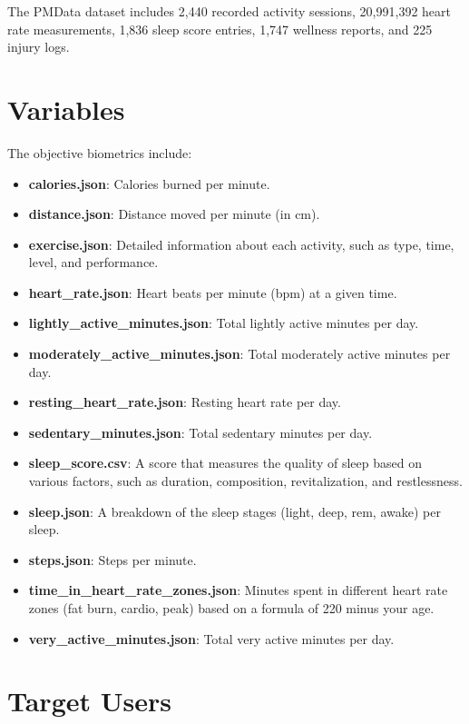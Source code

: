 \documentclass[10pt]{extarticle}
\begin{document}
The PMData dataset includes 2,440 recorded activity sessions, 20,991,392 heart rate measurements, 1,836 sleep score entries, 1,747 wellness reports, and 225 injury logs.

\newpage

\section{Variables}

The objective biometrics include:

\begin{itemize}
    \item \textbf{calories.json}: Calories burned per minute.
    \item \textbf{distance.json}: Distance moved per minute (in cm).
    \item \textbf{exercise.json}: Detailed information about each activity, such as type, time, level, and performance.
    \item \textbf{heart\_rate.json}: Heart beats per minute (bpm) at a given time.
    \item \textbf{lightly\_active\_minutes.json}: Total lightly active minutes per day.
    \item \textbf{moderately\_active\_minutes.json}: Total moderately active minutes per day.
    \item \textbf{resting\_heart\_rate.json}: Resting heart rate per day.
    \item \textbf{sedentary\_minutes.json}: Total sedentary minutes per day.
    \item \textbf{sleep\_score.csv}: A score that measures the quality of sleep based on various factors, such as duration, composition, revitalization, and restlessness.
    \item \textbf{sleep.json}: A breakdown of the sleep stages (light, deep, rem, awake) per sleep.
    \item \textbf{steps.json}: Steps per minute.
    \item \textbf{time\_in\_heart\_rate\_zones.json}: Minutes spent in different heart rate zones (fat burn, cardio, peak) based on a formula of 220 minus your age.
    \item \textbf{very\_active\_minutes.json}: Total very active minutes per day.
\end{itemize}

\section{Target Users}
\end{document}

